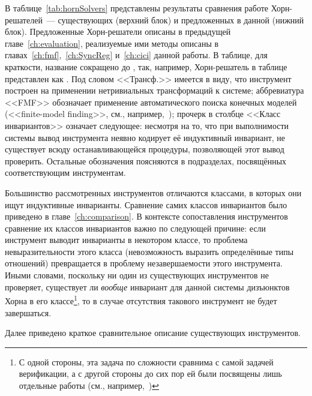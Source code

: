 В таблице~\cref{tab:hornSolvers} представлены результаты сравнения работе Хорн-решателей~--- существующих (верхний блок) и предложенных в данной (нижний блок). Предложенные Хорн-решатели описаны в предыдущей главе~\ref{ch:evaluation}, реализуемые ими методы описаны в главах~\ref{ch:fmf},~\ref{ch:SyncReg} и~\ref{ch:cici} данной работы. В таблице, для краткости, название \theringen{} сокращено до \theringen{}, так, например, Хорн-решатель \ringenSync{} в таблице представлен как \ringenSync{}. Под словом <<Трансф.>> имеется в виду, что инструмент построен на применении нетривиальных трансформаций к системе; аббревиатура <<FMF>> обозначает применение автоматического поиска конечных моделей (<<finite-model finding>>, см., например,~\cite{10.1007/978-3-319-40970-2_20,reynolds2013finite}); прочерк в столбце <<Класс инвариантов>> означает следующее: несмотря на то, что при выполнимости системы вывод инструмента неявно кодирует её индуктивный инвариант, не существует всюду останавливающейся процедуры, позволяющей этот вывод проверить. Остальные обозначения поясняются в подразделах, посвящённых соответствующим инструментам.

Большинство рассмотренных инструментов отличаются классами, в которых они ищут индуктивные инварианты. Сравнение самих классов инвариантов было приведено в главе~\cref{ch:comparison}. В контексте сопоставления инструментов сравнение их классов инвариантов важно по следующей причине: если инструмент выводит инварианты в некотором классе, то проблема невыразительности этого класса (невозможность выразить определённые типы отношений) превращается в проблему незавершаемости этого инструмента. Иными словами, поскольку ни один из существующих инструментов не проверяет, существует ли \emph{вообще} инвариант для данной системы дизъюнктов Хорна в его классе\footnote{С одной стороны, эта задача по сложности сравнима с самой задачей верификации, а с другой стороны до сих пор ей были посвящены лишь отдельные работы (см., например,~\cite{10.1145/3022187,10.1145/2837614.2837640})}, то в случае отсутствия такового инструмент не будет завершаться.

Далее приведено краткое сравнительное описание существующих инструментов.

